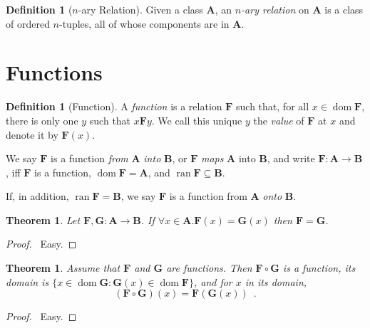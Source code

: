 \documentclass{report}
\let\qed\relax
\newtheorem{theorem}[axiom]{Theorem}
\theoremstyle{definition}
\newtheorem{definition}[axiom]{Definition}
\newcommand{\dom}{\ensuremath{\operatorname{dom}}}
\newcommand{\ran}{\ensuremath{\operatorname{ran}}}
\begin{document}
    \begin{definition}[$n$-ary Relation]
        Given a class $\mathbf{A}$, an \emph{$n$-ary relation} on $\mathbf{A}$ is a class of ordered
        $n$-tuples, all of whose components are in $\mathbf{A}$.
    \end{definition}

    \section{Functions}

    \begin{definition}[Function]
        A \emph{function} is a relation $\mathbf{F}$ such that, for all $x \in \dom \mathbf{F}$,
        there is only one $y$ such that $x \mathbf{F} y$. We call this unique $y$ the \emph{value}
        of $\mathbf{F}$ at $x$ and denote it by $\mathbf{F}(x)$.

        We say $\mathbf{F}$ is a function \emph{from} $\mathbf{A}$ \emph{into} $\mathbf{B}$,
        or $\mathbf{F}$ \emph{maps} $\mathbf{A}$ into $\mathbf{B}$, and write $\mathbf{F} : \mathbf{A}
        \rightarrow \mathbf{B}$, iff $\mathbf{F}$ is a function, $\dom \mathbf{F} = \mathbf{A}$,
        and $\ran \mathbf{F} \subseteq \mathbf{B}$.

        If, in addition, $\ran \mathbf{F} = \mathbf{B}$, we say $\mathbf{F}$ is a function from $\mathbf{A}$
        \emph{onto} $\mathbf{B}$.
    \end{definition}

    \begin{theorem}
        Let $\mathbf{F}, \mathbf{G} : \mathbf{A} \rightarrow \mathbf{B}$. If $\forall x \in \mathbf{A}.
        \mathbf{F}(x) = \mathbf{G}(x)$ then $\mathbf{F} = \mathbf{G}$.
    \end{theorem}

    \begin{proof}
        \pf\ Easy. \qed
    \end{proof}

    \begin{theorem}
        Assume that $\mathbf{F}$ and $\mathbf{G}$ are functions. Then $\mathbf{F} \circ \mathbf{G}$
        is a function, its domain is $\{ x \in \dom \mathbf{G} : \mathbf{G}(x) \in \dom \mathbf{F} \}$,
        and for $x$ in its domain,
        \[ (\mathbf{F} \circ \mathbf{G})(x) = \mathbf{F}(\mathbf{G}(x)) \enspace . \]
    \end{theorem}

    \begin{proof}
        \pf\ Easy. \qed
    \end{proof}
\end{document}
